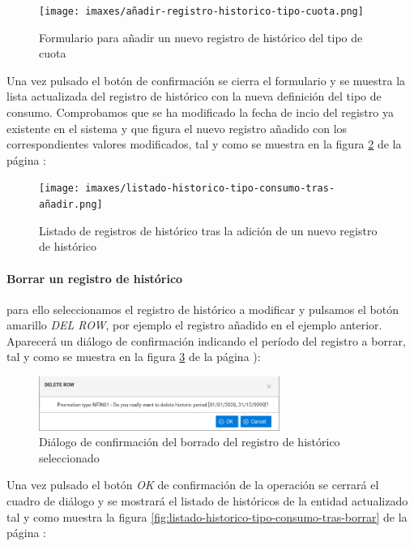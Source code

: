 \begin{figure}[H]
  \centering
  \texttt{[image: imaxes/añadir-registro-historico-tipo-cuota.png]}
  \caption{Formulario para añadir un nuevo registro de histórico del tipo de cuota}
  \label{fig:añadir-registro-historico-tipo-cuota}
\end{figure}


Una vez pulsado el botón de confirmación se cierra el formulario y se muestra la lista actualizada del registro de histórico con la nueva definición del tipo de consumo. Comprobamos que se ha modificado la fecha de incio del registro ya existente en el sistema y que figura el nuevo registro añadido con los correspondientes valores modificados, tal y como se muestra en la figura \ref{fig:listado-historico-tipo-consumo-tras-añadir} de la página \pageref{fig:listado-historico-tipo-consumo-tras-añadir}:

\begin{figure}[H]
  \centering
  \texttt{[image: imaxes/listado-historico-tipo-consumo-tras-añadir.png]}
  \caption{Listado de registros de histórico tras la adición de un nuevo registro de histórico}
  \label{fig:listado-historico-tipo-consumo-tras-añadir}
\end{figure}


\paragraph{Borrar un registro de histórico} para ello seleccionamos el registro de histórico a modificar y pulsamos el botón amarillo \emph{DEL ROW}, por ejemplo el registro añadido en el ejemplo anterior. Aparecerá un diálogo de confirmación indicando el período del registro a borrar, tal y como se muestra en la figura \ref{fig:borrado-historico-tipo-cuota} de la página \pageref{fig:borrado-historico-tipo-cuota}):


\begin{figure}[H]
  \centering
  \includegraphics[width=0.70\textwidth]{imaxes/borrado-historico-tipo-cuota.png}
  \caption{Diálogo de confirmación del borrado del registro de histórico seleccionado}
  \label{fig:borrado-historico-tipo-cuota}
\end{figure}


Una vez pulsado el botón  \emph{OK}  de confirmación de la operación se cerrará el cuadro de diálogo y se mostrará el listado de históricos de la entidad actualizado tal y como muestra la figura \ref{fig:listado-historico-tipo-consumo-tras-borrar} de la página \pageref{fig:listado-historico-tipo-consumo-tras-borrar}:


